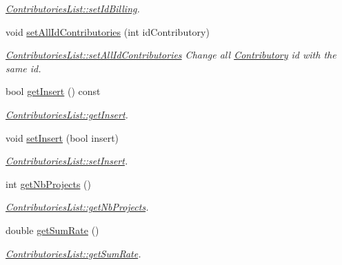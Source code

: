 \begin{DoxyCompactItemize}
\begin{DoxyCompactList}\small\item\em \hyperlink{classModels_1_1ContributoriesList_ad93d74f1b3e0a4ad83bad859812b3547}{Contributories\-List\-::set\-Id\-Billing}. \end{DoxyCompactList}\item 
void \hyperlink{classModels_1_1ContributoriesList_a313800788580eb469df125fe8d47c6a6}{set\-All\-Id\-Contributories} (int id\-Contributory)
\begin{DoxyCompactList}\small\item\em \hyperlink{classModels_1_1ContributoriesList_a313800788580eb469df125fe8d47c6a6}{Contributories\-List\-::set\-All\-Id\-Contributories} Change all \hyperlink{classModels_1_1Contributory}{Contributory} id with the same id. \end{DoxyCompactList}\item 
bool \hyperlink{classModels_1_1ContributoriesList_ab5b32ef1b153af303852d10b0168a41f}{get\-Insert} () const 
\begin{DoxyCompactList}\small\item\em \hyperlink{classModels_1_1ContributoriesList_ab5b32ef1b153af303852d10b0168a41f}{Contributories\-List\-::get\-Insert}. \end{DoxyCompactList}\item 
void \hyperlink{classModels_1_1ContributoriesList_a5d34942a45954d98e53112e2523bee9b}{set\-Insert} (bool insert)
\begin{DoxyCompactList}\small\item\em \hyperlink{classModels_1_1ContributoriesList_a5d34942a45954d98e53112e2523bee9b}{Contributories\-List\-::set\-Insert}. \end{DoxyCompactList}\item 
int \hyperlink{classModels_1_1ContributoriesList_a026202989560ff9d462d6104b3788657}{get\-Nb\-Projects} ()
\begin{DoxyCompactList}\small\item\em \hyperlink{classModels_1_1ContributoriesList_a026202989560ff9d462d6104b3788657}{Contributories\-List\-::get\-Nb\-Projects}. \end{DoxyCompactList}\item 
double \hyperlink{classModels_1_1ContributoriesList_ae2fd3ad53b082ee8adf3d0249e4f539b}{get\-Sum\-Rate} ()
\begin{DoxyCompactList}\small\item\em \hyperlink{classModels_1_1ContributoriesList_ae2fd3ad53b082ee8adf3d0249e4f539b}{Contributories\-List\-::get\-Sum\-Rate}. \end{DoxyCompactList}\item 

\end{DoxyCompactItemize}
